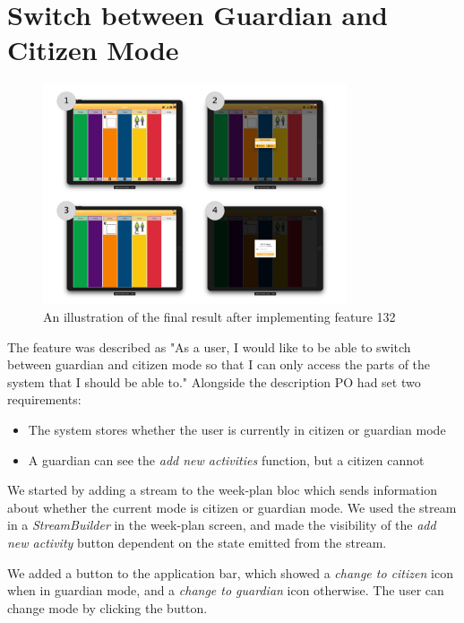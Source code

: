 \section{Switch between Guardian and Citizen Mode}

\begin{figure}[h]
    \centering
    \includegraphics[width=0.8\textwidth]{figures/feature_132.pdf}
    \caption{An illustration of the final result after implementing feature 132}
    \label{fig:feature132}
\end{figure}

The feature was described as "As a user, I would like to be able to switch between guardian and citizen mode so that I can only access the parts of the system that I should be able to." Alongside the description \gls{PO} had set two requirements:

\begin{itemize}
  \item The system stores whether the user is currently in citizen or guardian mode
  \item A guardian can see the \textit{add new activities} function, but a citizen cannot
\end{itemize}

We started by adding a stream to the week-plan \gls{bloc} which sends information about whether the current mode is citizen or guardian mode. We used the stream in a \textit{StreamBuilder} in the week-plan screen, and made the visibility of the \textit{add new activity} button dependent on the state emitted from the stream.

We added a button to the application bar, which showed a \textit{change to citizen} icon when in guardian mode, and a \textit{change to guardian} icon otherwise. The user can change mode by clicking the button.

